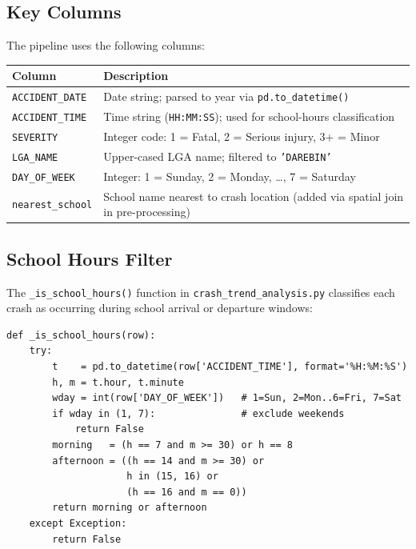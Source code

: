 \documentclass[11pt,a4paper,openany]{book}
\begin{document}
\subsection{Key Columns}

The pipeline uses the following columns:

\begin{center}
\begin{tabular}{L{4cm} L{9cm}}
\toprule
\textbf{Column} & \textbf{Description} \\
\midrule
\texttt{ACCIDENT\_DATE} & Date string; parsed to year via \texttt{pd.to\_datetime()} \\
\texttt{ACCIDENT\_TIME} & Time string (\texttt{HH:MM:SS}); used for school-hours classification \\
\texttt{SEVERITY}       & Integer code: 1 = Fatal, 2 = Serious injury, 3+ = Minor \\
\texttt{LGA\_NAME}      & Upper-cased LGA name; filtered to \texttt{'DAREBIN'} \\
\texttt{DAY\_OF\_WEEK}  & Integer: 1 = Sunday, 2 = Monday, \ldots, 7 = Saturday \\
\texttt{nearest\_school}& School name nearest to crash location (added via spatial join in pre-processing) \\
\bottomrule
\end{tabular}
\end{center}

\subsection{School Hours Filter}

The \texttt{\_is\_school\_hours()} function in \texttt{crash\_trend\_analysis.py} classifies each crash as occurring during school arrival or departure windows:

\begin{lstlisting}[style=python, caption={School hours classification logic.}]
def _is_school_hours(row):
    try:
        t    = pd.to_datetime(row['ACCIDENT_TIME'], format='%H:%M:%S')
        h, m = t.hour, t.minute
        wday = int(row['DAY_OF_WEEK'])   # 1=Sun, 2=Mon..6=Fri, 7=Sat
        if wday in (1, 7):               # exclude weekends
            return False
        morning   = (h == 7 and m >= 30) or h == 8
        afternoon = ((h == 14 and m >= 30) or
                     h in (15, 16) or
                     (h == 16 and m == 0))
        return morning or afternoon
    except Exception:
        return False
\end{lstlisting}
\end{document}
